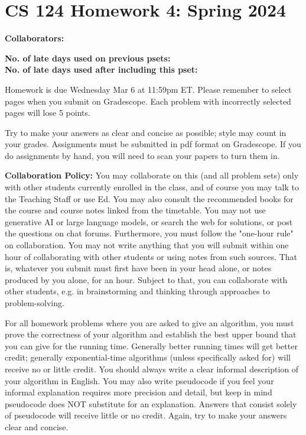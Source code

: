 \documentclass[11pt]{article}
\begin{document}
        \section*{CS 124 Homework 4: Spring 2024}


        \textbf{Collaborators: }

        \textbf{No. of late days used on previous psets: }\\
        \textbf{No. of late days used after including this pset: }

Homework is due {\color{blue} Wednesday Mar 6 at 11:59pm ET}. 
{\color{purple} Please remember to select pages when you submit on Gradescope. Each problem with incorrectly selected pages will lose 5 points.}

Try to make your answers as clear and concise as possible;
style may count in your grades. Assignments must be submitted in pdf format on Gradescope. If you do assignments by hand, you will need to scan your papers to turn them in.


{\bf Collaboration Policy:} You may collaborate on this (and all problem sets) only with other students currently enrolled in the class, and of course you may talk to the Teaching Staff or use Ed. You may also consult the recommended books for the course and course notes linked from the timetable. You may not use generative AI or large language models, or search the web for solutions, or post the questions on chat forums. Furthermore, you must follow the "one-hour rule" on collaboration.  You may not write anything that you will submit within one hour of collaborating with other students or using notes from such sources. That is, whatever you submit must first have been in your head alone, or notes produced by you alone, for an hour. Subject to that, you can collaborate with other students, e.g. in brainstorming and thinking through approaches to problem-solving.


For all homework problems where you are asked to give an algorithm, you must prove the correctness
of your algorithm and establish the best upper bound that you can give for the running time. Generally
better running times will get better credit; generally exponential-time algorithms (unless specifically asked
for) will receive no or little credit. You should always write a clear informal description of your algorithm
in English. You may also write pseudocode if you feel your informal explanation requires more precision
and detail, but keep in mind pseudocode does NOT substitute for an explanation. Answers that consist
solely of pseudocode will receive little or no credit. Again, try to make your answers clear and concise.
\end{document}

